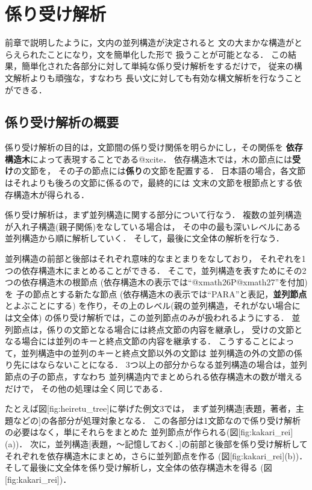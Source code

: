 \section{係り受け解析}

前章で説明したように，文内の並列構造が決定されると
文の大まかな構造がとらえられたことになり，文を簡単化した形で
扱うことが可能となる．
この結果，簡単化された各部分に対して単純な係り受け解析をするだけで，
従来の構文解析よりも頑強な，すなわち
長い文に対しても有効な構文解析を行なうことができる．

\subsection{係り受け解析の概要}

係り受け解析の目的は，文節間の係り受け関係を明らかにし，その関係を
{\bf 依存構造木}によって表現することである@xcite．
依存構造木では，木の節点には{\bf 受け}の文節を，
その子の節点には{\bf 係り}の文節を配置する．
日本語の場合，各文節はそれよりも後ろの文節に係るので，最終的には
文末の文節を根節点とする依存構造木が得られる．

係り受け解析は，まず並列構造に関する部分について行なう．
複数の並列構造が入れ子構造(親子関係)をなしている場合は，
その中の最も深いレベルにある並列構造から順に解析していく．
そして，最後に文全体の解析を行なう．

{\unitlength=1mm
}

並列構造の前部と後部はそれぞれ意味的なまとまりをなしており，
それぞれを1つの依存構造木にまとめることができる．
そこで，並列構造を表すためにその2つの依存構造木の根節点
(依存構造木の表示では``@xmath26P@xmath27''を付加)を
子の節点とする新たな節点
(依存構造木の表示では``PARA''と表記，{\bf 並列節点}とよぶことにする)
を作り，その上のレベル(親の並列構造，それがない場合には文全体)
の係り受け解析では，この並列節点のみが扱われるようにする．
並列節点は，係りの文節となる場合には終点文節の内容を継承し，
受けの文節となる場合には並列のキーと終点文節の内容を継承する．
こうすることによって，並列構造中の並列のキーと終点文節以外の文節は
並列構造の外の文節の係り先にはならないことになる．
3つ以上の部分からなる並列構造の場合は，並列節点の子の節点，すなわち
並列構造内でまとめられる依存構造木の数が増えるだけで，
その他の処理は全く同じである．

たとえば図[fig:heiretu_tree]に挙げた例文3では，
まず並列構造[表題，著者，主題などの]の各部分が処理対象となる．
この各部分は1文節なので係り受け解析の必要はなく，単にそれらをまとめた
並列節点が作られる(図[fig:kakari_rei](a))．
次に，並列構造[表題，〜記憶しておく．]の前部と後部を係り受け解析して
それぞれを依存構造木にまとめ，さらに並列節点を作る
(図[fig:kakari_rei](b))．
そして最後に文全体を係り受け解析し，文全体の依存構造木を得る
(図[fig:kakari_rei])．

